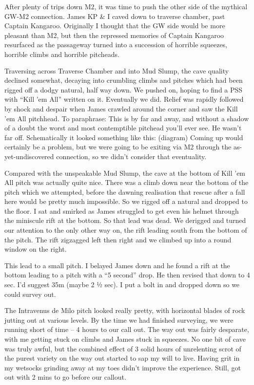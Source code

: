 After plenty of trips down M2, it was time to push the other side of the
mythical GW-M2 connection. James KP \& I caved down to traverse chamber,
past Captain Kangaroo. Originally I thought that the GW side would be
more pleasant than M2, but then the repressed memories of Captain
Kangaroo resurfaced as the passageway turned into a succession of
horrible squeezes, horrible climbs and horrible pitcheads.

Traversing across Traverse Chamber and into Mud Slump, the cave quality
declined somewhat, decaying into crumbling climbs and pitches which had
been rigged off a dodgy natural, half way down. We pushed on, hoping to
find a PSS with ``Kill 'em All'' written on it. Eventually we did.
Relief was rapidly followed by shock and despair when James crawled
around the corner and saw the Kill 'em All pitchhead. To paraphrase:
This is by far and away, and without a shadow of a doubt the worst and
most contemptible pitchead you'll ever see. He wasn't far off.
Schematically it looked something like this: (diagram) Coming up would
certainly be a problem, but we were going to be exiting via M2 through
the as-yet-undiscovered connection, so we didn't consider that
eventuality.

Compared with the unspeakable Mud Slump, the cave at the bottom of Kill
'em All pitch was actually quite nice. There was a climb down near the
bottom of the pitch which we attempted, before the dawning realisation
that rescue after a fall here would be pretty much impossible. So we
rigged off a natural and dropped to the floor. I sat and smirked as
James struggled to get even his helmet through the miniscule rift at the
bottom. So that lead was dead. We derigged and turned our attention to
the only other way on, the rift leading south from the bottom of the
pitch. The rift zigzagged left then right and we climbed up into a round
window on the right.

This lead to a small pitch. I belayed James down and he found a rift at
the bottom leading to a pitch with a ``5 second'' drop. He then revised
that down to 4 sec. I'd suggest 35m (maybe 2 ½ sec). I put a bolt in and
dropped down so we could survey out.

The Intravenus de Milo pitch looked really pretty, with horizontal
blades of rock jutting out at various levels. By the time we had
finished surveying, we were running short of time -- 4 hours to our call
out. The way out was fairly desparate, with me getting stuck on climbs
and James stuck in squeezes. No one bit of cave was truly awful, but the
combined effect of 3 solid hours of unrelenting scrot of the purest
variety on the way out started to sap my will to live. Having grit in my
wetsocks grinding away at my toes didn't improve the experience. Still,
got out with 2 mins to go before our callout.

